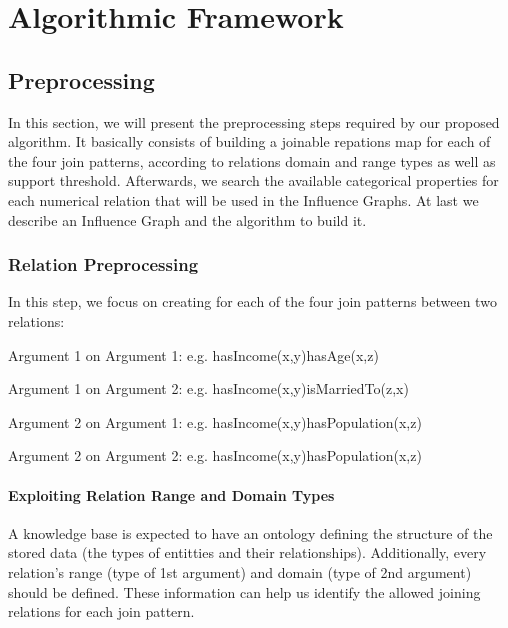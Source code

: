 \chapter{Algorithmic Framework}
\label{ch:intro}

\section{Preprocessing}

In this section, we will present the preprocessing steps required by our proposed algorithm. It basically consists of building a joinable repations map for each of the four join patterns, according to relations domain and range types as well as support threshold. Afterwards, we search the available categorical properties for each numerical relation that will be used in the Influence Graphs. At last we describe an Influence Graph and the algorithm to build it.

\subsection{Relation Preprocessing}

In this step, we focus on creating for each of the four join patterns between two relations:

\begin{itemset}
 \item Argument 1 on Argument 1: e.g. hasIncome(x,y)hasAge(x,z)
 \item Argument 1 on Argument 2: e.g. hasIncome(x,y)isMarriedTo(z,x)
 \item Argument 2 on Argument 1: e.g. hasIncome(x,y)hasPopulation(x,z)
 \item Argument 2 on Argument 2: e.g. hasIncome(x,y)hasPopulation(x,z)
\end{itemset}



\subsubsection{Exploiting Relation Range and Domain Types}

A knowledge base is expected to have an ontology defining the structure of the stored data (the types of entitties and their relationships). Additionally, every relation's range (type of 1st argument) and domain (type of 2nd argument) should be defined. These information can help us identify the allowed joining relations for each join pattern.

